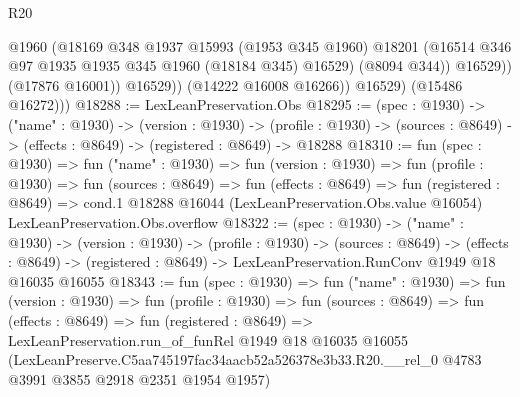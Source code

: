 \begin{lexlean}{R20}
\begin{coremodule}
                      @1960
                      (@18169
                        @348
                        @1937
                        @15993
                        (@1953 @345 @1960)
                        @18201
                        (@16514 @346 @97 @1935 @1935 @345 @1960 (@18184 @345) @16529)
                        (@8094 @344))
                      @16529))
                  (@17876 @16001))
                @16529))
            (@14222 @16008 @16266))
          @16529)
        (@15486 @16272)))
@18288 := LexLeanPreservation.Obs
@18295 := (spec : @1930) ->
  ("name" : @1930) ->
  (version : @1930) ->
  (profile : @1930) -> (sources : @8649) -> (effects : @8649) -> (registered : @8649) -> @18288
@18310 := fun (spec : @1930) =>
  fun ("name" : @1930) =>
  fun (version : @1930) =>
  fun (profile : @1930) =>
  fun (sources : @8649) =>
  fun (effects : @8649) =>
  fun (registered : @8649) =>
  cond.{1} @18288 @16044 (LexLeanPreservation.Obs.value @16054) LexLeanPreservation.Obs.overflow
@18322 := (spec : @1930) ->
  ("name" : @1930) ->
  (version : @1930) ->
  (profile : @1930) ->
  (sources : @8649) ->
  (effects : @8649) -> (registered : @8649) -> LexLeanPreservation.RunConv @1949 @18 @16035 @16055
@18343 := fun (spec : @1930) =>
  fun ("name" : @1930) =>
  fun (version : @1930) =>
  fun (profile : @1930) =>
  fun (sources : @8649) =>
  fun (effects : @8649) =>
  fun (registered : @8649) =>
  LexLeanPreservation.run_of_funRel
    @1949
    @18
    @16035
    @16055
    (LexLeanPreserve.C5aa745197fac34aacb52a526378e3b33.R20.__rel_0
      @4783
      @3991
      @3855
      @2918
      @2351
      @1954
      @1957)
\end{coremodule}
\end{lexlean}
